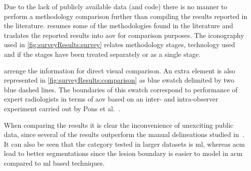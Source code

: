 Due to the lack of publicly available data (and code) there is no manner to perform a methodology comparison further than compiling the results reported in the literature.
 resumes some of the methodologies found in the literature and traslates the reported results into \ac{aov} for comparison purposes.
The iconography used in \cref{fig:surveyResults:survey} relates methodology stages, technology used and if the stages have been treated separately or as a single stage.

 arrenge the information for direct visual comparison.
An extra element is also represented in \cref{fig:surveyResults:comparison} as blue swatch delimited by two blue dashed lines.
The boundaries of this swatch correspond to performance of expert radiologists in terms of \ac{aov} based on an inter- and intra-observer experiment carried out by Pons et al.~\cite{gerard2013}.

When comparing the results it is clear the inconvenience of unexciting public data, since several of the results outperform the manual delineations studied in~\cite{gerard2013}.
It can also be seen that the category tested in larger datasets is \ac{ml}, whereas \ac{acm} lead to better segmentations since the lesion boundary is easier to model in \ac{acm} compared to \ac{ml} based techniques.


